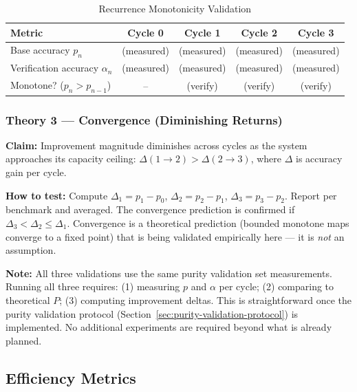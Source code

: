 \documentclass[12pt,a4paper]{article}
\theoremstyle{definition}
\begin{document}
\begin{table}[htbp]
\centering
\caption{Recurrence Monotonicity Validation}
\begin{tabular}{lcccc}
\toprule
\textbf{Metric} & \textbf{Cycle 0} & \textbf{Cycle 1} & \textbf{Cycle 2} & \textbf{Cycle 3} \\
\midrule
Base accuracy $p_n$ & (measured) & (measured) & (measured) & (measured) \\
Verification accuracy $\alpha_n$ & (measured) & (measured) & (measured) & (measured) \\
Monotone? ($p_n > p_{n-1}$) & -- & (verify) & (verify) & (verify) \\
\bottomrule
\end{tabular}
\end{table}

\subsubsection*{Theory 3 — Convergence (Diminishing Returns)}

\textbf{Claim:} Improvement magnitude diminishes across cycles as the system approaches its capacity ceiling: $\Delta(1{\to}2) > \Delta(2{\to}3)$, where $\Delta$ is accuracy gain per cycle.

\textbf{How to test:} Compute $\Delta_1 = p_1 - p_0$, $\Delta_2 = p_2 - p_1$, $\Delta_3 = p_3 - p_2$. Report per benchmark and averaged. The convergence prediction is confirmed if $\Delta_3 < \Delta_2 \leq \Delta_1$. Convergence is a theoretical prediction (bounded monotone maps converge to a fixed point) that is being validated empirically here — it is \textit{not} an assumption.

\begin{keyinsightbox}
\textbf{Note:} All three validations use the same purity validation set measurements. Running all three requires: (1) measuring $p$ and $\alpha$ per cycle; (2) comparing to theoretical $P$; (3) computing improvement deltas. This is straightforward once the purity validation protocol (Section~\ref{sec:purity-validation-protocol}) is implemented. No additional experiments are required beyond what is already planned.
\end{keyinsightbox}

\subsection{Efficiency Metrics}
\end{document}

